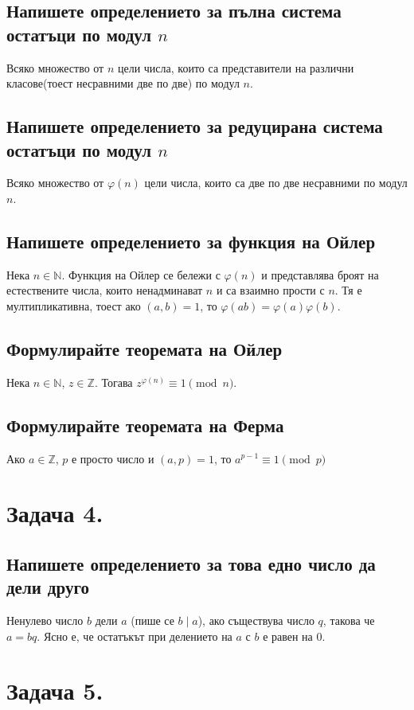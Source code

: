 \documentclass[12pt]{article}
\newcommand*{\Z}{\mathbb{Z}}
\newcommand*{\N}{\mathbb{N}}
\begin{document}
\subsection*{Напишете определението за пълна система остатъци по модул $n$}
Всяко множество от $n$ цели числа, които са представители на различни класове(тоест несравними две по две) по модул $n$.

\subsection*{Напишете определението за редуцирана система остатъци по модул $n$}
Всяко множество от $\varphi(n)$ цели числа, които са две по две несравними по модул $n$.

\subsection*{Напишете определението за функция на Ойлер}
Нека $n \in \N$. Функция на Ойлер се бележи с $\varphi(n)$ и представлява броят на естествените числа, които ненадминават $n$ и са взаимно прости с $n$. Тя е мултипликативна, тоест ако $(a, b) = 1$, то $\varphi(ab) = \varphi(a)\varphi(b)$.

\subsection*{Формулирайте теоремата на Ойлер}
Нека $n \in \N$, $z \in \Z$. Тогава $z^{\varphi(n)} \equiv 1 \pmod{n}$.

\subsection*{Формулирайте теоремата на Ферма}
Ако $a \in \Z$, $p$ е просто число и $(a, p) = 1$, то $a^{p - 1} \equiv 1 \pmod{p}$

\section*{Задача 4.}

\subsection*{Напишете определението за това едно число да дели друго}
Ненулево число $b$ дели $a$ (пише се $b \mid a$), ако съществува число $q$, такова че $a = bq$. Ясно е, че остатъкът при делението на $a$ с $b$ е равен на 0.

\section*{Задача 5.}
\end{document}
